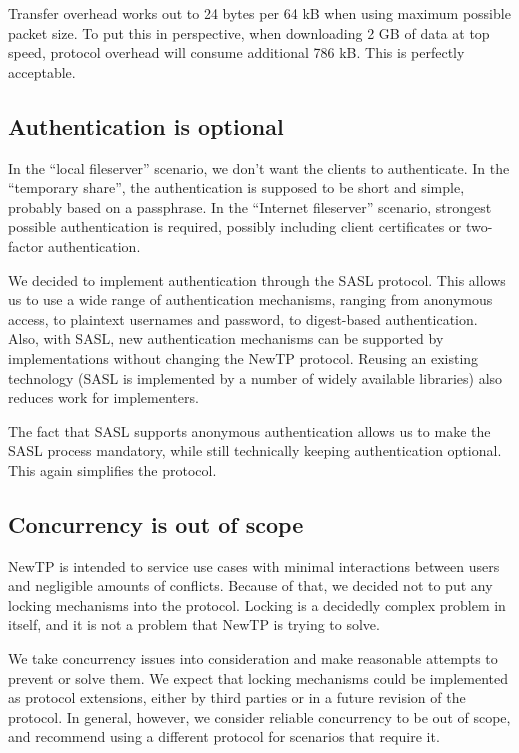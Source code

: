Transfer overhead works out to 24 bytes per 64 kB when using maximum possible packet size. To put this in
perspective, when downloading 2 GB of data at top speed, protocol overhead will consume additional 786 kB.
This is perfectly acceptable.

%

\subsection{Authentication is optional}

In the ``local fileserver'' scenario, we don't want the clients to authenticate. In the ``temporary share'',
the authentication is supposed to be short and simple, probably based on a passphrase. In the ``Internet
fileserver'' scenario, strongest possible authentication is required, possibly including client certificates
or two-factor authentication.

We decided to implement authentication through the SASL protocol. This allows us to use a wide range of
authentication mechanisms, ranging from anonymous access, to plaintext usernames and password, to digest-based
authentication. Also, with SASL, new authentication mechanisms can be supported by implementations without
changing the NewTP protocol. Reusing an existing technology (SASL is implemented by a number of widely
available libraries) also reduces work for implementers.

The fact that SASL supports anonymous authentication allows us to make the SASL process mandatory, while still
technically keeping authentication optional. This again simplifies the protocol.

%

\subsection{Concurrency is out of scope}

NewTP is intended to service use cases with minimal interactions between users and negligible amounts of
conflicts. Because of that, we decided not to put any locking mechanisms into the protocol. Locking is
a decidedly complex problem in itself, and it is not a problem that NewTP is trying to solve.

We take concurrency issues into consideration and make reasonable attempts to prevent or solve them. We expect
that locking mechanisms could be implemented as protocol extensions, either by third parties or in a future
revision of the protocol. In general, however, we consider reliable concurrency to be out of scope, and
recommend using a different protocol for scenarios that require it.

